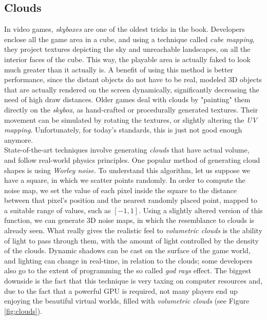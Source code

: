 \subsection{Clouds}

In video games, \textit{skyboxes} are one of the oldest tricks in the book. Developers enclose all the game area in a cube, and using a technique called \textit{cube mapping}, they project textures depicting the sky and unreachable landscapes, on all the interior faces of the cube\cite{skyboxWiki}. This way, the playable area is actually faked to look much greater than it actually is. A benefit of using this method is better performance, since the distant objects do not have to be real, modeled 3D objects that are actually rendered on the screen dynamically, significantly decreasing the need of high draw distances. Older games deal with clouds by "painting" them directly on the \textit{skybox}, as hand-crafted or procedurally generated textures\cite{roden2005clouds}. Their movement can be simulated by rotating the textures, or slightly altering the \textit{UV mapping}. Unfortunately, for today's standards, this is just not good enough anymore.\\

State-of-the-art techniques involve generating \textit{clouds} that have actual volume, and follow real-world physics principles\cite{ebert1997volumetric}. One popular method of generating cloud shapes is using \textit{Worley noise}. To understand this algorithm, let us suppose we have a square, in which we scatter points randomly. In order to compute the noise map, we set the value of each pixel inside the square to the distance between that pixel's position and the nearest randomly placed point, mapped to a suitable range of values, such as \([-1, 1]\). Using a slightly altered version of this function, we can generate 3D noise maps, in which the resemblance to clouds is already seen. What really gives the realistic feel to \textit{volumetric clouds} is the ability of light to pass through them, with the amount of light controlled by the density of the clouds. Dynamic shadows can be cast on the surface of the game world, and lighting can change in real-time, in relation to the clouds; some developers also go to the extent of programming the so called \textit{god rays} effect\cite{godraysWiki}. The biggest downside is the fact that this technique is very taxing on computer resources and, due to the fact that a powerful GPU is required, not many players end up enjoying the beautiful virtual worlds, filled with \textit{volumetric clouds} (see Figure \ref{fig:clouds}).

